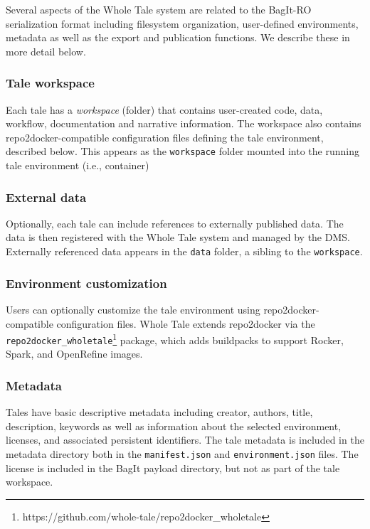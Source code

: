 \documentclass[conference]{IEEEtran}
\begin{document}
Several aspects of the Whole Tale system are related to the BagIt-RO serialization format including filesystem organization, user-defined environments, metadata as well as the export and publication functions. We describe these in more detail below.

\subsubsection{Tale workspace}
Each tale has a \emph{workspace} (folder) that contains user-created code, data, workflow, documentation and narrative information. The workspace also contains repo2docker-compatible configuration files defining the tale environment, described below. This appears as the \texttt{workspace} folder mounted into the running tale environment (i.e., container)

\subsubsection{External data}
Optionally, each tale can include references to externally published data. The data is then registered with the Whole Tale system and managed by the DMS. Externally referenced data appears in the \texttt{data} folder, a sibling to the \texttt{workspace}.

\subsubsection{Environment customization}
Users can optionally customize the tale environment using repo2docker-compatible configuration files. Whole Tale extends repo2docker via the \texttt{repo2docker\_wholetale}\footnote{https://github.com/whole-tale/repo2docker\_wholetale} package, which adds buildpacks to support Rocker, Spark, and OpenRefine images. 

\subsubsection{Metadata}

Tales have basic descriptive metadata including creator, authors, title, description, keywords as well as information about the selected environment, licenses, and associated persistent identifiers. The tale metadata is included in the metadata directory both in the \texttt{manifest.json} and \texttt{environment.json} files.  The license is included in the BagIt payload directory, but not as part of the tale workspace.
\end{document}
